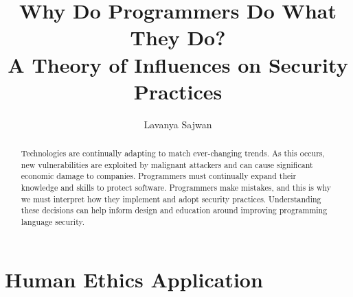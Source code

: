 \documentclass[11pt
              , a4paper
             , twoside
              , openright
              ]{report}
\title{Why Do Programmers Do What They Do? \protect\\ A Theory of Influences on Security Practices}
\author{Lavanya Sajwan}
\date{}
\begin{document}
\frontmatter



\begin{abstract}

Technologies are continually adapting to match ever-changing trends. As this occurs, new vulnerabilities are exploited by malignant attackers and can cause significant economic damage to companies. Programmers must continually expand their knowledge and skills to protect software. Programmers make mistakes, and this is why we must interpret how they implement and adopt security practices. Understanding these decisions can help inform design and education around improving programming language security.

\end{abstract}


\maketitle



\tableofcontents



\mainmatter










\backmatter







\appendix
\chapter{Human Ethics Application}

\end{document}
